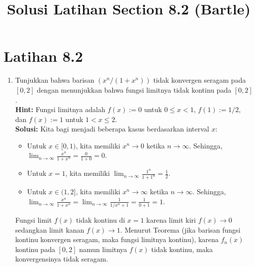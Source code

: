 ﻿\documentclass{article}
\title{Solusi Latihan Section 8.2 (Bartle)}
\author{}
\date{}
\begin{document}
\maketitle

\section*{Latihan 8.2}

\begin{enumerate}

  \item[1.] Tunjukkan bahwa barisan $(x^n/(1+x^n))$ tidak konvergen seragam pada $[0, 2]$ dengan menunjukkan bahwa fungsi limitnya tidak kontinu pada $[0, 2]$.\\
        \textbf{Hint:} Fungsi limitnya adalah $f(x) := 0$ untuk $0 \le x < 1$, $f(1) := 1/2$, dan $f(x) := 1$ untuk $1 < x \le 2$.\\
        \textbf{Solusi:}
        Kita bagi menjadi beberapa kasus berdasarkan interval $x$:
        \begin{itemize}
          \item Untuk $x \in [0, 1)$, kita memiliki $x^n \to 0$ ketika $n \to \infty$. Sehingga, $\lim_{n \to \infty} \frac{x^n}{1+x^n} = \frac{0}{1+0} = 0$.
          \item Untuk $x = 1$, kita memiliki $\lim_{n \to \infty} \frac{1^n}{1+1^n} = \frac{1}{2}$.
          \item Untuk $x \in (1, 2]$, kita memiliki $x^n \to \infty$ ketika $n \to \infty$. Sehingga, $\lim_{n \to \infty} \frac{x^n}{1+x^n} = \lim_{n \to \infty} \frac{1}{1/x^n + 1} = \frac{1}{0+1} = 1$.
        \end{itemize}
        Fungsi limit $f(x)$ tidak kontinu di $x=1$ karena limit kiri $f(x) \to 0$ sedangkan limit kanan $f(x) \to 1$. Menurut Teorema (jika barisan fungsi kontinu konvergen seragam, maka fungsi limitnya kontinu), karena $f_n(x)$ kontinu pada $[0,2]$ namun limitnya $f(x)$ tidak kontinu, maka konvergensinya tidak seragam.


\end{enumerate}
\end{document}
